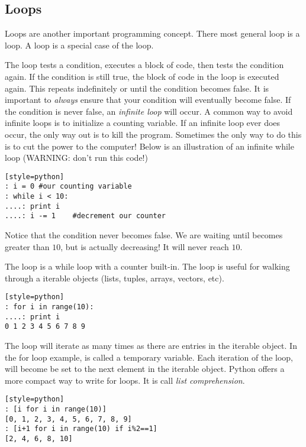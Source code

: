 \subsection*{Loops}
Loops are another important programming concept. There most general loop is a  loop.  A  loop is a special case of the  loop.

The  loop tests a condition, executes a block of code, then tests the condition again.  If the condition is still true, the block of code in the  loop is executed again.  This repeats indefinitely or until the condition becomes false.  It is important to \emph{always} ensure that your condition will eventually become false.  If the condition is never false, an \emph{infinite loop} will occur.  A common way to avoid infinite loops is to initialize a counting variable.  If an infinite loop ever does occur, the only way out is to kill the program.  Sometimes the only way to do this is to cut the power to the computer!  Below is an illustration of an infinite while loop (WARNING: don't run this code!)
\begin{lstlisting}[style=python][style=python]
: i = 0 #our counting variable
: while i < 10:
....: print i
....: i -= 1    #decrement our counter
\end{lstlisting}

Notice that the condition never becomes false.  We are waiting until  becomes greater than $10$, but  is actually decreasing!  It will never reach $10$.

The  loop is a while loop with a counter built-in.  The  loop is useful for walking through a iterable objects (lists, tuples, arrays, vectors, etc).  
\begin{lstlisting}[style=python][style=python]
: for i in range(10):
....: print i
0 1 2 3 4 5 6 7 8 9
\end{lstlisting}

The loop will iterate as many times as there are entries in the iterable object. In the for loop example,  is called a temporary variable.  Each iteration of the loop,  will become be set to the next element in the iterable object.  Python offers a more compact way to write for loops.  It is call \emph{list comprehension}.
\begin{lstlisting}[style=python][style=python]
: [i for i in range(10)]
[0, 1, 2, 3, 4, 5, 6, 7, 8, 9]
: [i+1 for i in range(10) if i%2==1] 
[2, 4, 6, 8, 10]
\end{lstlisting}

